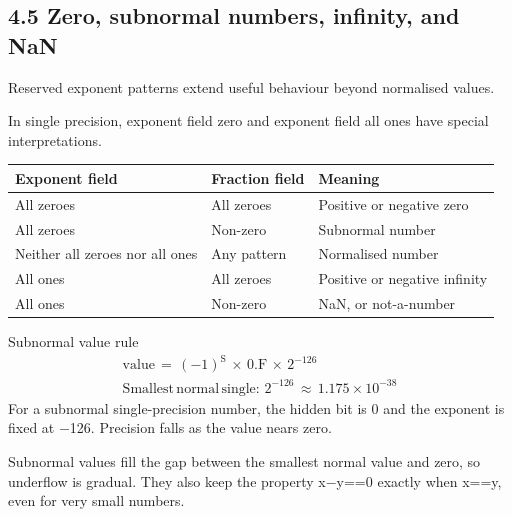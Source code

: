 \documentclass[11pt]{article}
\begin{document}
\begin{keepsection}
\section{4.5 Zero, subnormal numbers, infinity, and NaN}

Reserved exponent patterns extend useful behaviour beyond normalised values.

In single precision, exponent field zero and exponent field all ones have special interpretations.

\begin{center}\small\begin{tabularx}{\linewidth}{>{\raggedright\arraybackslash}X>{\raggedright\arraybackslash}X>{\raggedright\arraybackslash}X}\toprule
\textbf{Exponent field} & \textbf{Fraction field} & \textbf{Meaning} \\ \midrule
All zeroes & All zeroes & Positive or negative zero \\
All zeroes & Non-zero & Subnormal number \\
Neither all zeroes nor all ones & Any pattern & Normalised number \\
All ones & All zeroes & Positive or negative infinity \\
All ones & Non-zero & NaN, or not-a-number \\
\bottomrule\end{tabularx}\end{center}

\begin{equationcard}{Subnormal value rule}
\[ \begin{gathered} \text{value}\, =\, (-1)^{\mathrm{S}}\, \times \, 0.\mathrm{F}\, \times \, 2^{-126} \\ \text{Smallest}\, \text{normal}\, \text{single}:\, 2^{-126}\, \approx \, 1.175\times 10^{-38} \end{gathered} \]
{\small For a subnormal single-precision number, the hidden bit is 0 and the exponent is fixed at \ensuremath{-}126. Precision falls as the value nears zero.}
\end{equationcard}

Subnormal values fill the gap between the smallest normal value and zero, so underflow is gradual. They also keep the property x\ensuremath{-}y==0 exactly when x==y, even for very small numbers.


\end{keepsection}
\end{document}
